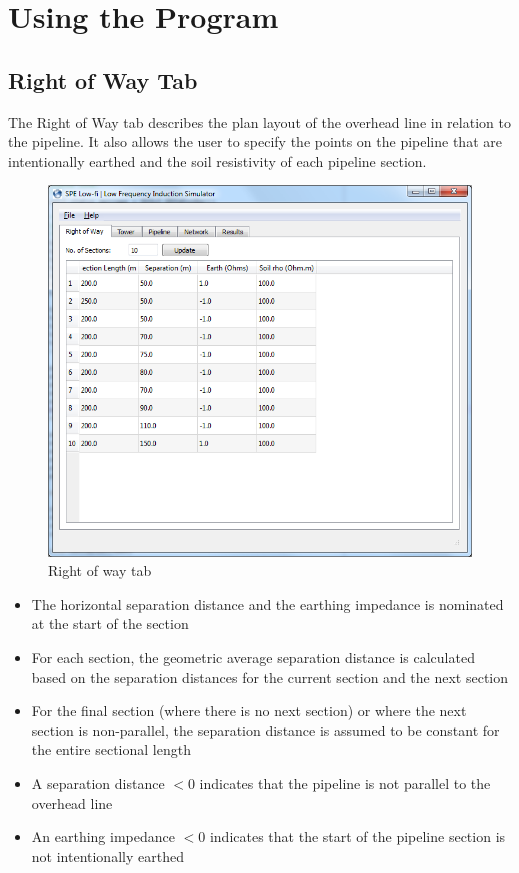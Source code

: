 \documentclass{article}
\begin{document}
\newpage
\section{Using the Program}
\subsection{Right of Way Tab}
The Right of Way tab describes the plan layout of the overhead line in relation to the pipeline. It also allows the user to specify the points on the pipeline that are intentionally earthed and the soil resistivity of each pipeline section. 

\begin{figure}[!htp]
\begin{center}
\caption{Right of way tab}
\label{fig:right_of_way}
\includegraphics[width=0.9\linewidth]{./Figures/right_of_way.png}
\end{center}
\end{figure}

\begin{itemize}
\item The horizontal separation distance and the earthing impedance is nominated at the start of the section
\item For each section, the geometric average separation distance is calculated based on the separation distances for the current section and the next section
\item For the final section (where there is no next section) or where the next section is non-parallel, the separation distance is assumed to be constant for the entire sectional length
\item A separation distance $<$0 indicates that the pipeline is not parallel to the overhead line
\item An earthing impedance $<$0 indicates that the start of the pipeline section is not intentionally earthed
\end{itemize}
\end{document}

